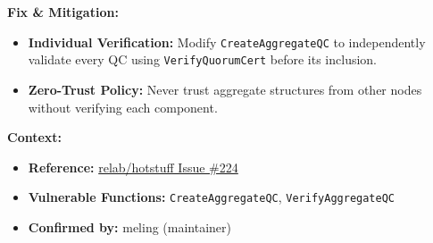 \documentclass{article}
\theoremstyle{plain}
\theoremstyle{definition}
\theoremstyle{remark}
\begin{document}
{\vspace{0.5em}
\textbf{Fix \& Mitigation:}
\begin{itemize}
    \item \textbf{Individual Verification:} Modify \texttt{CreateAggregateQC} to independently validate every QC using \texttt{VerifyQuorumCert} before its inclusion.
    \item \textbf{Zero-Trust Policy:} Never trust aggregate structures from other nodes without verifying each component.
\end{itemize}

\vspace{0.5em}
\textbf{Context:}
\begin{itemize}
    \item \textbf{Reference:} \href{https://github.com/relab/hotstuff/issues/224}{relab/hotstuff Issue \#224}
    \item \textbf{Vulnerable Functions:} \texttt{CreateAggregateQC}, \texttt{VerifyAggregateQC}
    \item \textbf{Confirmed by:} meling (maintainer)
\end{itemize}
}
\end{document}
